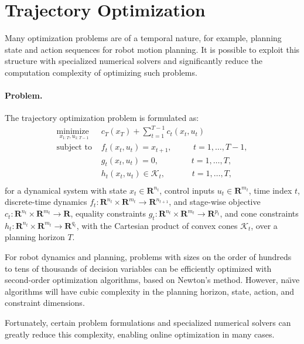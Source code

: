 \section{Trajectory Optimization}
Many optimization problems are of a temporal nature, for example, planning state and action sequences for robot motion planning. It is possible to exploit this structure with specialized numerical solvers and significantly reduce the computation complexity of optimizing such problems.

\paragraph{Problem.}
The trajectory optimization problem is formulated as:
\begin{equation}
	\begin{array}{ll}
		\underset{x_{1:T}, u_{1:T-1}}{\mbox{minimize }} & c_T(x_T) + \sum \limits_{t = 1}^{T-1} c_t(x_t, u_t)\\
		\mbox{subject to } & f_t(x_t, u_t) = x_{t+1},\phantom{\mathcal{K},} \, \quad t = 1,\dots,T-1,\\
		& g_t(x_t, u_t) = 0,\phantom{\,_{t+1}\mathcal{K}_t}\quad t = 1, \dots, T,\\
		& h_t(x_t, u_t) \in \mathcal{K}_t,\phantom{\,x_{t+1}}\quad t = 1, \dots, T, \label{intro_trajopt}\\
	\end{array}
\end{equation}
for a dynamical system with state $x_t \in \mathbf{R}^{n_t}$, control inputs $u_t \in \mathbf{R}^{m_t}$, time index $t$, discrete-time dynamics $f_t : \mathbf{R}^{n_t} \times \mathbf{R}^{m_t} \rightarrow \mathbf{R}^{n_{t+1}}$, and stage-wise objective $c_t: \mathbf{R}^{n_t} \times \mathbf{R}^{m_t} \rightarrow \mathbf{R}$,  equality constraints $g_t : \mathbf{R}^{n_t} \times \mathbf{R}^{m_t} \rightarrow \mathbf{R}^{p_t}$, and cone constraints $h_t : \mathbf{R}^{n_t} \times \mathbf{R}^{m_t} \rightarrow \mathbf{R}^{q_t}$, 
with the Cartesian product of convex cones $\mathcal{K}_t$, over a planning horizon $T$.

For robot dynamics and planning, problems with sizes on the order of hundreds to tens of thousands of decision variables can be efficiently optimized with second-order optimization algorithms, based on Newton's method. However, na\"{\i}ve algorithms will have cubic complexity in the planning horizon, state, action, and constraint dimensions.

Fortunately, certain problem formulations and specialized numerical solvers can greatly reduce this complexity, enabling online optimization in many cases.

